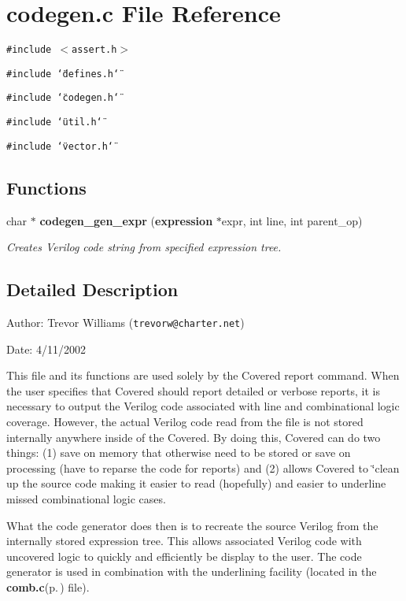 \section{codegen.c File Reference}
\label{codegen_8c}
{\tt \#include $<$assert.h$>$}\par
{\tt \#include \char`\"{}defines.h\char`\"{}}\par
{\tt \#include \char`\"{}codegen.h\char`\"{}}\par
{\tt \#include \char`\"{}util.h\char`\"{}}\par
{\tt \#include \char`\"{}vector.h\char`\"{}}\par
\subsection*{Functions}
\begin{CompactItemize}
\item 
char $\ast$ {\bf codegen\_\-gen\_\-expr} ({\bf expression} $\ast$expr, int line, int parent\_\-op)
\begin{CompactList}\small\item\em Creates Verilog code string from specified expression tree. \item\end{CompactList}\end{CompactItemize}


\subsection{Detailed Description}
\begin{Desc}
\item[Author:]Trevor Williams ({\tt trevorw@charter.net}) \end{Desc}
\begin{Desc}
\item[Date:]4/11/2002\end{Desc}
\begin{Desc}
\item[]This file and its functions are used solely by the Covered report command. When the user specifies that Covered should report detailed or verbose reports, it is necessary to output the Verilog code associated with line and combinational logic coverage. However, the actual Verilog code read from the file is not stored internally anywhere inside of the Covered. By doing this, Covered can do two things: (1) save on memory that otherwise need to be stored or save on processing (have to reparse the code for reports) and (2) allows Covered to \char`\"{}clean up the source code making it easier to read (hopefully) and easier to underline missed combinational logic cases.\end{Desc}
\begin{Desc}
\item[]What the code generator does then is to recreate the source Verilog from the internally stored expression tree. This allows associated Verilog code with uncovered logic to quickly and efficiently be display to the user. The code generator is used in combination with the underlining facility (located in the {\bf comb.c}{\rm (p.\,\pageref{comb_8c})} file).\end{Desc}


